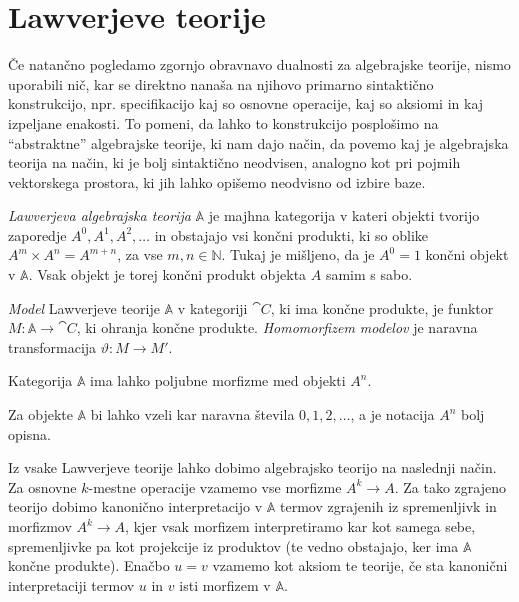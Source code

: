 \documentclass[../kategoricna_logika.tex]{subfiles}
\begin{document}
\section{Lawverjeve teorije}
\label{sec:org3518651}
Če natančno pogledamo zgornjo obravnavo dualnosti za algebrajske teorije, nismo uporabili nič,
kar se direktno nanaša na njihovo primarno sintaktično konstrukcijo, npr. specifikacijo
kaj so osnovne operacije, kaj so aksiomi in kaj izpeljane enakosti.
To pomeni, da lahko to konstrukcijo posplošimo na "`abstraktne"' algebrajske teorije,
ki nam dajo način, da povemo kaj je algebrajska teorija na način, ki je bolj
sintaktično neodvisen, analogno kot pri pojmih vektorskega prostora, ki jih lahko
opišemo neodvisno od izbire baze.
\begin{definicija}
\emph{Lawverjeva algebrajska teorija} \(\mathbb{A}\) je majhna kategorija
v kateri objekti tvorijo zaporedje \(A^0, A^1, A^2, \ldots\) in obstajajo
vsi končni produkti, ki so oblike \(A^m \times A^n = A^{m + n}\), za vse \(m,n \in \mathbb{N}\).
Tukaj je mišljeno, da je \(A^0 = 1\) končni objekt v \(\mathbb{A}\).
Vsak objekt je torej končni produkt objekta \(A\) samim s sabo.

\emph{Model} Lawverjeve teorije \(\mathbb{A}\) v kategoriji \(\cat{C}\),
ki ima končne produkte, je funktor \(M : \mathbb{A} \to \cat{C}\),
ki ohranja končne produkte. \emph{Homomorfizem modelov} je naravna
transformacija \(\vartheta : M \to M'\).
\end{definicija}
%
\begin{opomba}
Kategorija \(\mathbb{A}\) ima lahko poljubne morfizme med objekti \(A^n\).
\end{opomba}
\begin{opomba}
Za objekte \(\mathbb{A}\) bi lahko vzeli kar naravna števila \(0, 1, 2, \ldots\),
a je notacija \(A^n\) bolj opisna.
\end{opomba}
%
Iz vsake Lawverjeve teorije lahko dobimo algebrajsko teorijo na naslednji način.
Za osnovne \(k\)-mestne operacije vzamemo vse morfizme \(A^k \to A\). 
Za tako zgrajeno teorijo dobimo kanonično interpretacijo v \(\mathbb{A}\) termov
zgrajenih iz spremenljivk in morfizmov \(A^k \to A\), kjer vsak morfizem interpretiramo
kar kot samega sebe, spremenljivke pa kot projekcije iz produktov (te vedno obstajajo,
ker ima \(\mathbb{A}\) končne produkte). Enačbo \(u = v\) vzamemo kot aksiom te teorije,
če sta kanonični interpretaciji termov \(u\) in \(v\) isti morfizem v \(\mathbb{A}\).
\end{document}
